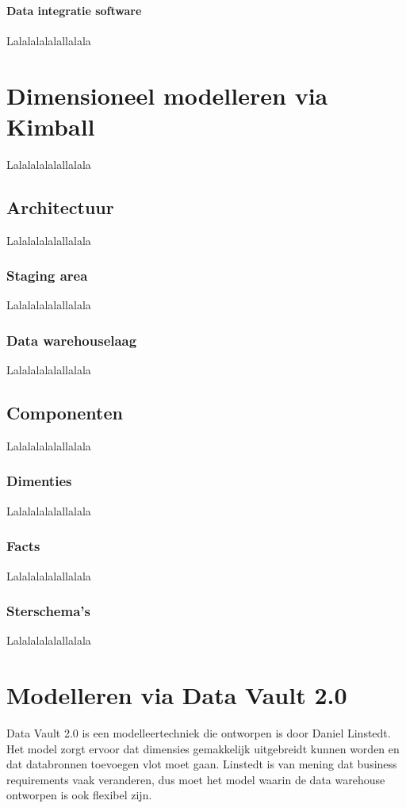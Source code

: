 \paragraph{Data integratie software}
\label{sec:etl}
Lalalalalalallalala

\section{Dimensioneel modelleren via Kimball}
Lalalalalalallalala

\subsection{Architectuur}
Lalalalalalallalala

\subsubsection{Staging area}
Lalalalalalallalala

\subsubsection{Data warehouselaag}
Lalalalalalallalala

\subsection{Componenten}
Lalalalalalallalala

\subsubsection{Dimenties}
Lalalalalalallalala

\subsubsection{Facts}
Lalalalalalallalala

\subsubsection{Sterschema's}
Lalalalalalallalala

\section{Modelleren via Data Vault 2.0}
Data Vault 2.0 is een modelleertechniek die ontworpen is door Daniel Linstedt. Het model zorgt ervoor dat dimensies gemakkelijk uitgebreidt kunnen worden en dat databronnen toevoegen vlot moet gaan. Linstedt is van mening dat business requirements vaak veranderen, dus moet het model waarin de data warehouse ontworpen is ook flexibel zijn. 
~\autocite{Linstedt2016}
